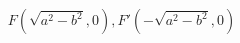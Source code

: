 \documentclass[preview]{standalone}
\begin{document}
\begin{align*}
F(\sqrt{a^2-b^2}, 0), F'(-\sqrt{a^2-b^2}, 0)
\end{align*}
\end{document}
